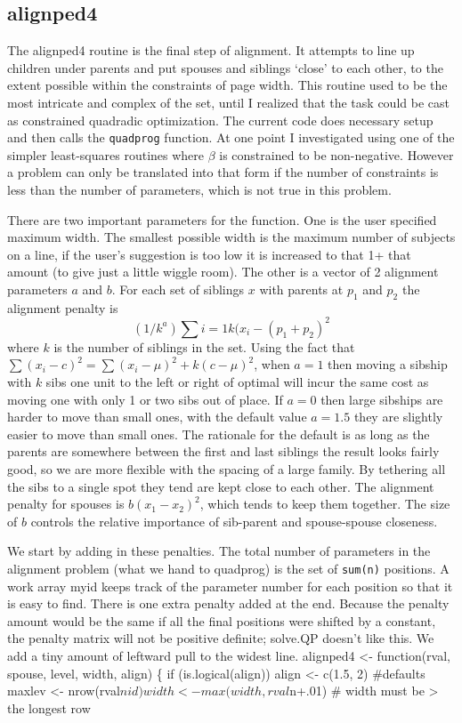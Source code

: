 \documentclass{article}
\begin{document}
\begin{enumerate}
\section{alignped4}
The alignped4 routine is the final step of alignment.  It attempts to line
up children under parents and put spouses and siblings `close' to each other,%
to the extent possible within the constraints of page width.  This routine
used to be the most intricate and complex of the set, until I realized that
the task could be cast as constrained quadradic optimization.
The current code does necessary setup and then calls the {\tt{}quadprog}
function.  
At one point I investigated using one of the simpler least-squares routines
where $\beta$ is constrained to be non-negative. 
However a problem can only be translated into that form if the number
of constraints is less than the number of parameters, which is not
true in this problem.

There are two important parameters for the function.  One is the user specified
maximum width.  The smallest possible width is the maximum number of subjects
on a line, if the user's suggestion  %
is too low it is increased to that 1+ that
amount (to give just a little wiggle room).
The other is a vector of 2 alignment parameters $a$ and $b$.
For each set of siblings ${x}$ with parents at $p_1$ and $p_2$ the
alignment penalty is
$$
   (1/k^a)\sum{i=1}{k} (x_i - (p_1 + p_2)^2
$$
where $k$ is the number of siblings in the set.
Using the fact that $\sum(x_i-c)^2 = \sum(x_i-\mu)^2 + k(c-\mu)^2$,
when $a=1$ then moving a sibship with $k$ sibs one unit to the left or
right of optimal will incur the same cost as moving one with only 1 or
two sibs out of place.  If $a=0$ then large sibships are harder to move
than small ones, with the default value $a=1.5$ they are slightly easier 
to move than small ones.  The rationale for the default is as long as the
parents are somewhere between the first and last siblings the result looks
fairly good, so we are more flexible with the spacing of a large family.
By tethering all the sibs to a single spot they tend are kept close to 
each other.
The alignment penalty for spouses is $b(x_1 - x_2)^2$, which tends to keep 
them together.  The size of $b$ controls the relative importance of sib-parent
and spouse-spouse closeness.

We start by adding in these penalties.  The total number of parameters
in the alignment problem (what we hand to quadprog) is the set 
of {\tt{}sum(n)} positions.  A work array myid keeps track of the parameter
number for each position so that it is easy to find.
There is one extra penalty added at the end.  Because the penalty amount
would be the same if all the final positions were shifted by a constant,
the penalty matrix will not be positive definite; solve.QP doesn't like  %
this.  We add a tiny amount of leftward pull to the widest line.
\nwenddocs{}\endmoddef
alignped4 <- function(rval, spouse, level, width, align) \{
    if (is.logical(align)) align <- c(1.5, 2)  #defaults
    maxlev <- nrow(rval$nid)
    width <- max(width, rval$n+.01)   # width must be > the longest row


\end{enumerate}
\end{document}
